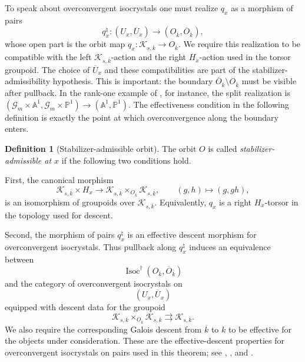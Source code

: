 \documentclass[11pt]{amsart}
\theoremstyle{plain}
\theoremstyle{definition}
\newtheorem{definition}{Definition}[section]
\theoremstyle{remark}
\newcommand{\Isoc}{\operatorname{Isoc}}
\begin{document}
To speak about overconvergent isocrystals one must realize \(q_x\) as a
morphism of pairs
\[
  q_x^\natural:
  (U_x,\overline U_x)
  \longrightarrow
  (O_{\overline{k}},\overline O_{\overline{k}}),
\]
whose open part is the orbit map
\(q_x:\mathcal K_{s,\overline k}\to O_{\overline k}\).  We require this
realization to be compatible with the left \(\mathcal K_{s,\overline k}\)-action
and the right \(H_x\)-action used in the torsor groupoid.  The choice of
\(\overline U_x\) and these compatibilities are part of the
stabilizer-admissibility hypothesis.  This is
important: the boundary \(\overline O_{\overline k}\setminus O_{\overline k}\)
must be visible after pullback.  In the rank-one example of
, for instance, the split realization is
\((\mathcal G_m\times\mathbb A^1,\mathcal G_m\times\mathbb P^1)\to
(\mathbb A^1,\mathbb P^1)\).  The effectiveness condition in the following
definition is exactly the point at which overconvergence along the boundary
enters.

\begin{definition}[Stabilizer-admissible orbit]
\label{def:stabilizer-admissible-orbit}
The orbit \(O\) is called \emph{stabilizer-admissible at \(x\)} if the
following two conditions hold.

First, the canonical morphism
\[
  \mathcal K_{s,\overline k}\times H_x
  \longrightarrow
  \mathcal K_{s,\overline k}\times_{O_{\overline k}}
  \mathcal K_{s,\overline k},
  \qquad
  (g,h)\longmapsto(g,gh),
\]
is an isomorphism of groupoids over \(\mathcal K_{s,\overline k}\).  Equivalently,
\(q_x\) is a right \(H_x\)-torsor in the topology used for descent.

Second, the morphism of pairs \(q_x^\natural\) is an effective descent morphism
for overconvergent isocrystals.  Thus pullback along \(q_x^\natural\) induces an
equivalence between
\[
  \Isoc^\dagger(O_{\overline k},\overline O_{\overline k})
\]
and the category of overconvergent isocrystals on
\[
  (U_x,\overline U_x)
\]
equipped with descent data for the groupoid
\[
  \mathcal K_{s,\overline k}\times_{O_{\overline k}}
  \mathcal K_{s,\overline k}
  \rightrightarrows
  \mathcal K_{s,\overline k}.
\]
We also require the corresponding Galois descent from \(\overline k\) to \(k\)
to be effective for the objects under consideration.  These are the
effective-descent properties for overconvergent isocrystals on pairs used in
this theorem; see \cite[Sections 7--8]{LeStumOverconvergentSite},
\cite[Theorem 5.1]{LazdaDescent}, and
\cite[\S2]{KedlayaNotesIsocrystals}.
\end{definition}
\end{document}
